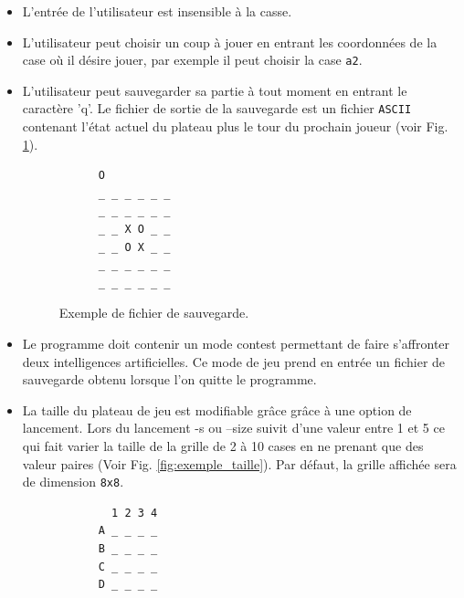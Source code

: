 \documentclass[10pt,a4paper]{article}
\begin{document}
\begin {itemize}
\item  L'entrée de l'utilisateur est insensible à la casse.
\item  L'utilisateur peut choisir un coup à jouer en entrant les coordonnées de la case où il désire jouer, par exemple il peut choisir la case \verb!a2!.
\item  L'utilisateur peut sauvegarder sa partie à tout moment en entrant le caractère 'q'. Le fichier de sortie de la sauvegarde est un fichier \verb!ASCII! contenant l'état actuel du plateau plus le tour du prochain joueur (voir Fig. \ref{fig:exemple_save}).
  \begin{figure}[H]    
    \centering
    \begin{BVerbatim}
      O
      _ _ _ _ _ _
      _ _ _ _ _ _
      _ _ X O _ _
      _ _ O X _ _
      _ _ _ _ _ _
      _ _ _ _ _ _ 
    \end{BVerbatim}
    \caption {Exemple de fichier de sauvegarde.\label{fig:exemple_save}}
    \end{figure}

\item  Le programme doit contenir un mode contest permettant de faire s'affronter deux intelligences artificielles. Ce mode de jeu prend en entrée un fichier de sauvegarde obtenu lorsque l'on quitte le programme.
\item  La taille du plateau de jeu est modifiable grâce grâce à une option de lancement. Lors du lancement -s ou --size suivit d'une valeur entre 1 et 5 ce qui fait varier la taille de la grille de 2 à 10 cases en ne prenant que des valeur paires (Voir Fig. \ref{fig:exemple_taille}). Par défaut, la grille affichée sera de dimension \verb!8x8!.
  \begin{figure}[H]    
    \centering
    \begin{BVerbatim}
        1 2 3 4 
      A _ _ _ _
      B _ _ _ _
      C _ _ _ _
      D _ _ _ _
      

\end{BVerbatim}
\end{figure}
\end{itemize}
\end{document}
